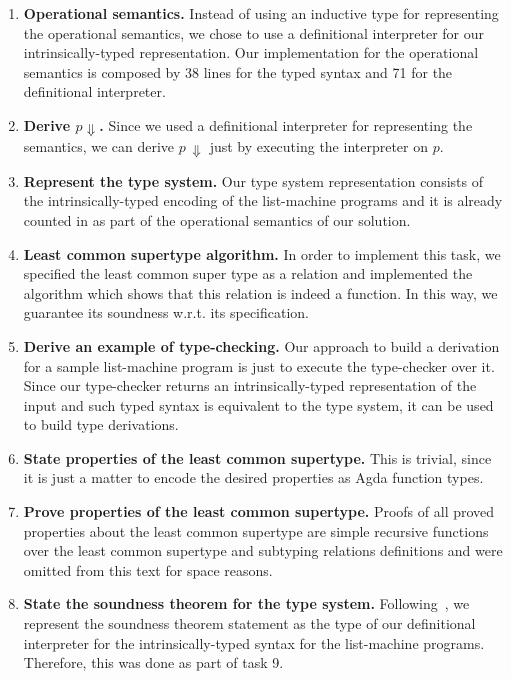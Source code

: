 \documentclass[sigconf]{acmart}
\theoremstyle{definition}
\begin{document}
\begin{enumerate}
  \item \textbf{Operational semantics.} Instead of using an inductive type for representing the operational semantics, we chose to
        use a definitional interpreter for our intrinsically-typed representation. Our implementation for the operational
        semantics is composed by 38 lines for the typed syntax and 71 for the definitional interpreter.
  \item \textbf{Derive $p \Downarrow$.} Since we used a definitional interpreter for representing the semantics, we can derive
        $p\,\Downarrow$ just by executing the interpreter on $p$.
  \item \textbf{Represent the type system.} Our type system representation consists of the intrinsically-typed encoding of
        the list-machine programs and it is already counted in as part of the operational semantics of our solution.
      \item \textbf{Least common supertype algorithm.} In order to implement this task, we specified the least common super type
        as a relation and implemented the algorithm which shows that this relation is indeed a function. In this way, we
        guarantee its soundness w.r.t. its specification.
  \item \textbf{Derive an example of type-checking.} Our approach to build a derivation for a sample list-machine program
        is just to execute the type-checker over it. Since our type-checker returns an intrinsically-typed representation of
        the input and such typed syntax is equivalent to the type system, it can be used to build type derivations.
  \item \textbf{State properties of the least common supertype.} This is trivial, since it is just a matter to encode the
        desired properties as Agda function types.
  \item \textbf{Prove properties of the least common supertype.} Proofs of all proved properties about the least common supertype
        are simple recursive functions over the least common supertype and subtyping relations definitions and were omitted
        from this text for space reasons.
  \item \textbf{State the soundness theorem for the type system.} Following~\citet{Amin17}, we represent the soundness
        theorem statement as the type of our definitional interpreter for the intrinsically-typed syntax for the list-machine
        programs. Therefore, this was done as part of task 9.

\end{enumerate}
\end{document}
